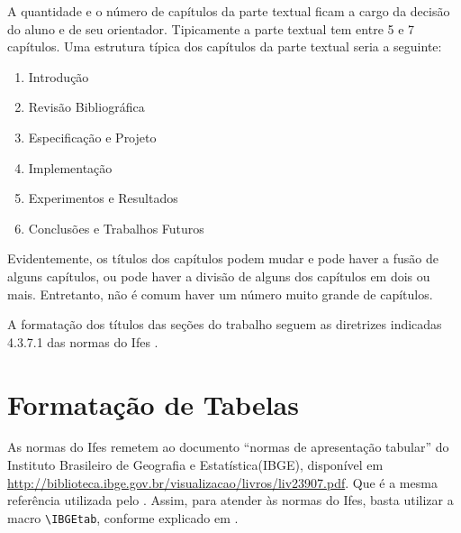 \documentclass[times,english,brazil,oneside]{ifes7}
\begin{document}
A quantidade e o número de capítulos da parte textual ficam a cargo da
decisão do aluno e de seu orientador. Tipicamente a parte textual tem
entre 5 e 7 capítulos. Uma estrutura típica dos capítulos da parte
textual seria a seguinte:

\begin{SingleSpace}
  \begin{enumerate}
  \item Introdução
  \item Revisão Bibliográfica
  \item Especificação e Projeto
  \item Implementação
  \item Experimentos e Resultados
  \item Conclusões e Trabalhos Futuros
  \end{enumerate}
\end{SingleSpace}

Evidentemente, os títulos dos capítulos podem mudar e pode haver a
fusão de alguns capítulos, ou pode haver a divisão de alguns dos
capítulos em dois ou mais. Entretanto, não é comum haver um número
muito grande de capítulos.

A formatação dos títulos das seções do trabalho seguem as diretrizes
indicadas 4.3.7.1 das normas do Ifes \cite[p.~34]{Ifes2014}.



\section{Formatação de Tabelas}
\label{sec:format-tabelas}

As normas do Ifes remetem ao documento ``normas de apresentação
tabular'' do Instituto Brasileiro de Geografia e Estatística(IBGE),
disponível em
\url{http://biblioteca.ibge.gov.br/visualizacao/livros/liv23907.pdf}.
Que é a mesma referência utilizada pelo \abnTeX. Assim, para atender
às normas do Ifes, basta utilizar a macro \verb!\IBGEtab!, conforme
explicado em \cite[p.~41]{Araujo2016}.
\end{document}
